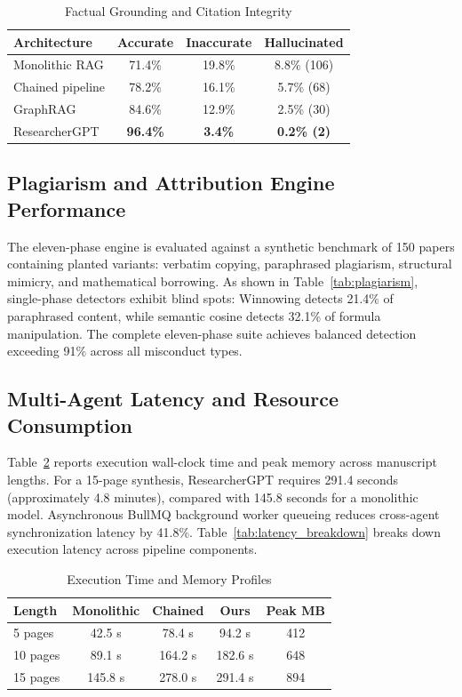 \documentclass[conference]{IEEEtran}
\begin{document}
\begin{table}[!t]
\caption{Factual Grounding and Citation Integrity}
\label{tab:citation}
\centering
\footnotesize
\setlength{\tabcolsep}{4pt}
\begin{tabular}{@{}lccc@{}}
\toprule
\textbf{Architecture} & \textbf{Accurate} & \textbf{Inaccurate} & \textbf{Hallucinated} \\
\midrule
Monolithic RAG & 71.4\% & 19.8\% & 8.8\% (106) \\
Chained pipeline & 78.2\% & 16.1\% & 5.7\% (68) \\
GraphRAG & 84.6\% & 12.9\% & 2.5\% (30) \\
ResearcherGPT & \textbf{96.4\%} & \textbf{3.4\%} & \textbf{0.2\% (2)} \\
\bottomrule
\end{tabular}
\end{table}

\subsection{Plagiarism and Attribution Engine Performance}
The eleven-phase engine is evaluated against a synthetic benchmark of 150 papers containing planted variants: verbatim copying, paraphrased plagiarism, structural mimicry, and mathematical borrowing. As shown in Table~\ref{tab:plagiarism}, single-phase detectors exhibit blind spots: Winnowing detects 21.4\% of paraphrased content, while semantic cosine detects 32.1\% of formula manipulation. The complete eleven-phase suite achieves balanced detection exceeding 91\% across all misconduct types.

\subsection{Multi-Agent Latency and Resource Consumption}
Table~\ref{tab:latency} reports execution wall-clock time and peak memory across manuscript lengths. For a 15-page synthesis, ResearcherGPT requires 291.4 seconds (approximately 4.8 minutes), compared with 145.8 seconds for a monolithic model. Asynchronous BullMQ background worker queueing reduces cross-agent synchronization latency by 41.8\%. Table~\ref{tab:latency_breakdown} breaks down execution latency across pipeline components.

\begin{table}[!t]
\caption{Execution Time and Memory Profiles}
\label{tab:latency}
\centering
\footnotesize
\setlength{\tabcolsep}{3pt}
\begin{tabular}{@{}lcccc@{}}
\toprule
\textbf{Length} & \textbf{Monolithic} & \textbf{Chained} & \textbf{Ours} & \textbf{Peak MB} \\
\midrule
5 pages & 42.5 s & 78.4 s & 94.2 s & 412 \\
10 pages & 89.1 s & 164.2 s & 182.6 s & 648 \\
15 pages & 145.8 s & 278.0 s & 291.4 s & 894 \\
\bottomrule
\end{tabular}
\end{table}
\end{document}

